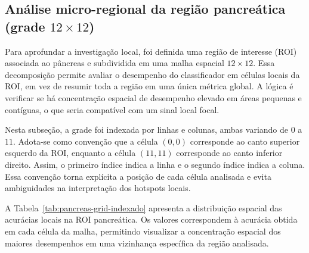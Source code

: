 \documentclass[12pt,a4paper]{article}
\begin{document}
\subsection{Análise micro-regional da região pancreática (grade \(12\times 12\))}
Para aprofundar a investigação local, foi definida uma região de interesse (ROI) associada ao pâncreas e subdividida em uma malha espacial \(12\times 12\). Essa decomposição permite avaliar o desempenho do classificador em células locais da ROI, em vez de resumir toda a região em uma única métrica global. A lógica é verificar se há concentração espacial de desempenho elevado em áreas pequenas e contíguas, o que seria compatível com um sinal local focal.

Nesta subseção, a grade foi indexada por linhas e colunas, ambas variando de \(0\) a \(11\). Adota-se como convenção que a célula \((0,0)\) corresponde ao canto superior esquerdo da ROI, enquanto a célula \((11,11)\) corresponde ao canto inferior direito. Assim, o primeiro índice indica a linha e o segundo índice indica a coluna. Essa convenção torna explícita a posição de cada célula analisada e evita ambiguidades na interpretação dos hotspots locais.

A Tabela~\ref{tab:pancreas-grid-indexado} apresenta a distribuição espacial das acurácias locais na ROI pancreática. Os valores correspondem à acurácia obtida em cada célula da malha, permitindo visualizar a concentração espacial dos maiores desempenhos em uma vizinhança específica da região analisada.
\end{document}
